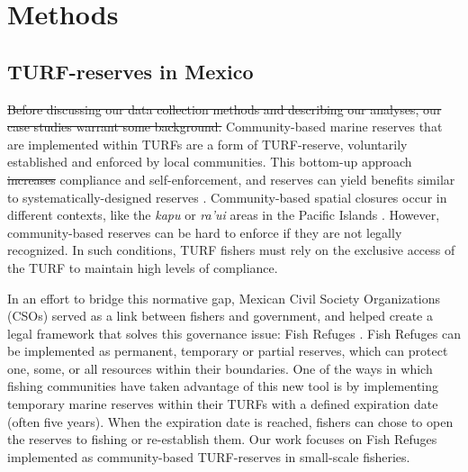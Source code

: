 \documentclass{frontiersSCNS}
\providecommand{\DIFaddtex}[1]{{\protect\color{blue}\uwave{#1}}} %
\providecommand{\DIFdeltex}[1]{{\protect\color{red}\sout{#1}}}                      %
\providecommand{\DIFaddbegin}{} %
\providecommand{\DIFaddend}{} %
\providecommand{\DIFdelbegin}{} %
\providecommand{\DIFdelend}{} %
\providecommand{\DIFadd}[1]{\texorpdfstring{\DIFaddtex{#1}}{#1}} %
\providecommand{\DIFdel}[1]{\texorpdfstring{\DIFdeltex{#1}}{}} %
\begin{document}
\hypertarget{methods}{%
\section{Methods}\label{methods}}

\hypertarget{turf-reserves-in-mexico}{%
\subsection{TURF-reserves in Mexico}\label{turf-reserves-in-mexico}}

\DIFdelbegin \DIFdel{Before discussing our data collection methods and describing our
analyses, our case studies warrant some background. }\DIFdelend Community-based marine reserves that are implemented within TURFs are a form of TURF-reserve, voluntarily established and enforced by local communities. This bottom-up approach \DIFdelbegin \DIFdel{increases }\DIFdelend \DIFaddbegin \DIFadd{can increase }\DIFaddend compliance and self-enforcement, and reserves can yield benefits similar to systematically-designed reserves \citep{beger_2004,smallhornwest_2018}. Community-based spatial closures occur in different contexts, like the \emph{kapu} or \emph{ra'ui} areas in the Pacific Islands \citep{johannes_2002,bohnsack_2004}. However, community-based reserves can be hard to enforce if they are not legally recognized. In such conditions, TURF fishers must rely on the exclusive access of the TURF to maintain high levels of compliance.

In an effort to bridge this normative gap, Mexican Civil Society Organizations (CSOs) served as a link between fishers and government, and helped create a legal framework that solves this governance issue: Fish Refuges \citep{nom}. Fish Refuges can be implemented as permanent, temporary or partial reserves, which can protect one, some, or all resources within their boundaries. One of the ways in which fishing communities have taken advantage of this new tool is by implementing temporary marine reserves within their TURFs with a defined expiration date (often five years). When the expiration date is reached, fishers can chose to open the reserves to fishing or re-establish them. Our work focuses on Fish Refuges implemented as community-based TURF-reserves in small-scale fisheries.
\end{document}
